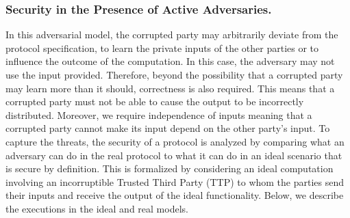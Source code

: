   
  
 \subsubsection{Security in the Presence of Active Adversaries.}  In this adversarial model, the corrupted party may
arbitrarily deviate from the protocol specification, to learn the private inputs of the other parties or to influence the outcome of the computation. In this case,  the adversary may not use the input provided. Therefore, beyond the possibility that a corrupted party may learn more than it should, correctness is also required. This means that a corrupted party must not be able to cause the output to be incorrectly distributed. Moreover, we require independence of inputs meaning that a corrupted party cannot make its input depend on the other party’s input. To capture the threats,
the security of a protocol is analyzed by comparing what an adversary can do in the real protocol to what it can do in an ideal scenario that is secure by definition. This is formalized by considering an ideal computation involving an incorruptible Trusted Third Party (TTP) to whom the parties send their inputs and receive the output of the ideal functionality. Below, we describe the executions in the ideal and real models. 
 
